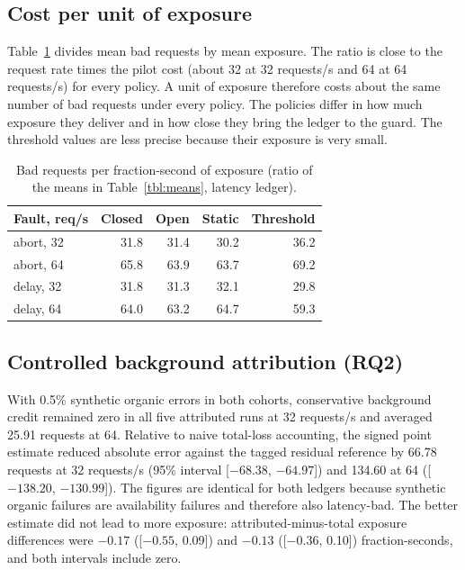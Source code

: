 \documentclass[a4paper,fleqn,11pt]{cas-dc}
\begin{document}
\subsection{Cost per unit of exposure}
Table~\ref{tbl:cost} divides mean bad requests by mean exposure. The ratio is close to the request rate times the pilot cost (about 32 at 32 requests/s and 64 at 64 requests/s) for every policy. A unit of exposure therefore costs about the same number of bad requests under every policy. The policies differ in how much exposure they deliver and in how close they bring the ledger to the guard. The threshold values are less precise because their exposure is very small.

\begin{table}[width=.95\linewidth,cols=5,pos=t]
\caption{Bad requests per fraction-second of exposure (ratio of the means in Table~\ref{tbl:means}, latency ledger).}\label{tbl:cost}
\footnotesize
\begin{tabular*}{\tblwidth}{@{\extracolsep{\fill}}lrrrr@{}}
\toprule
Fault, req/s & Closed & Open & Static & Threshold \\
\midrule
abort, 32 & 31.8 & 31.4 & 30.2 & 36.2 \\
abort, 64 & 65.8 & 63.9 & 63.7 & 69.2 \\
delay, 32 & 31.8 & 31.3 & 32.1 & 29.8 \\
delay, 64 & 64.0 & 63.2 & 64.7 & 59.3 \\
\bottomrule
\end{tabular*}
\end{table}

\subsection{Controlled background attribution (RQ2)}\label{sec:background}
With 0.5\% synthetic organic errors in both cohorts, conservative background credit remained zero in all five attributed runs at 32 requests/s and averaged 25.91 requests at 64. Relative to naive total-loss accounting, the signed point estimate reduced absolute error against the tagged residual reference by 66.78 requests at 32 requests/s (95\% interval [$-68.38$, $-64.97$]) and 134.60 at 64 ([$-138.20$, $-130.99$]). The figures are identical for both ledgers because synthetic organic failures are availability failures and therefore also latency-bad. The better estimate did not lead to more exposure: attributed-minus-total exposure differences were $-0.17$ ([$-0.55$, 0.09]) and $-0.13$ ([$-0.36$, 0.10]) fraction-seconds, and both intervals include zero.
\end{document}
